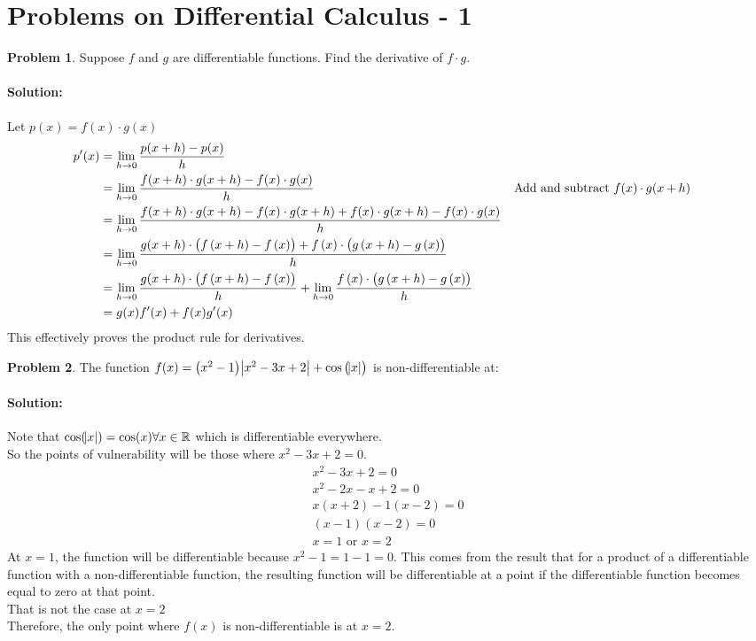 \documentclass[14]{article}
\theoremstyle{definition}
\newtheorem{prob}{Problem}
\theoremstyle{case}
\begin{document}
\section{Problems on Differential Calculus - 1}
\begin{prob}
Suppose $f$ and $g$ are differentiable functions. Find the derivative of $f \cdot g$.
\paragraph{Solution:} Let $p(x) = f(x) \cdot g(x)$
\begin{align*}
p'(x) &= \lim\limits_{h \to 0} \dfrac{p(x + h) - p(x)}{h}\\
&= \lim\limits_{h \to 0} \dfrac{f(x + h)\cdot g(x+h) - f(x)\cdot g(x)}{h} && \parbox[t]{5cm}{Add and subtract $f(x)\cdot g(x+h)$}\\
&= \lim\limits_{h \to 0} \dfrac{f(x + h)\cdot g(x+h) - f(x)\cdot g(x+h) + f(x)\cdot g(x+h) - f(x)\cdot g(x)}{h}\\
&= \lim\limits_{h \to 0} \dfrac{g(x+h)\cdot\left(f\left(x + h\right) - f\left(x\right)\right) + f\left(x\right)\cdot \left(g\left(x+h\right) - g\left(x\right)\right)}{h}\\
&= \lim\limits_{h \to 0} \dfrac{g(x+h)\cdot\left(f\left(x + h\right) - f\left(x\right)\right)}{h} + \lim\limits_{h \to 0} \dfrac{f\left(x\right)\cdot \left(g\left(x+h\right) - g\left(x\right)\right)}{h}\\
&= g(x) f'(x) + f(x) g'(x)
\end{align*}
This effectively proves the product rule for derivatives.\\
\end{prob}
\begin{prob}
The function
$f(x) = \left(x^2 - 1\right) \abs{x^2 -3x + 2} + \cos\left(\abs{x}\right)$ is non-differentiable at:\\
\paragraph{Solution:}
Note that $\cos(\abs{x}) = \cos(x) \forall x \in \mathbb{R}$ which is differentiable everywhere.\\
So the points of vulnerability will be those where $x^2 - 3x + 2 = 0$.
\begin{align*}
x^2 - 3x + 2 = 0\\
x^2 - 2x - x + 2 = 0\\
x(x + 2) - 1(x-2) = 0\\
(x-1)(x-2) = 0\\
x = 1 \text{ or } x = 2
\end{align*}
At $x = 1$, the function will be differentiable because $x^2 -1 = 1 - 1 = 0$. This comes from the result that for a product of a differentiable function with a non-differentiable function, the resulting function will be differentiable at a point if the differentiable function becomes equal to zero at that point.\\
That is not the case at $x = 2$\\
Therefore, the only point where $f(x)$ is non-differentiable is at $x = 2$.
\end{prob}
\end{document}
